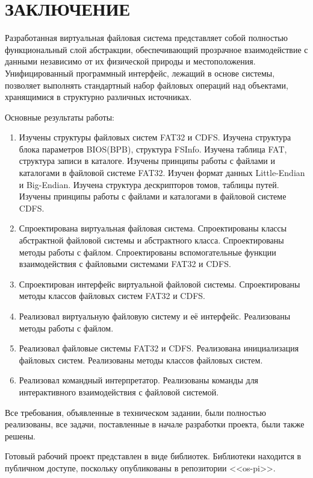 \section*{ЗАКЛЮЧЕНИЕ}

Разработанная виртуальная файловая система представляет собой полностью функциональный слой абстракции, обеспечивающий прозрачное взаимодействие с данными независимо от их физической природы и местоположения. Унифицированный программный интерфейс, лежащий в основе системы, позволяет выполнять стандартный набор файловых операций над объектами, хранящимися в структурно различных источниках.

Основные результаты работы:

\begin{enumerate}
\item Изучены структуры файловых систем FAT32 и CDFS. Изучена структура блока параметров BIOS(BPB), структура FSInfo. Изучена таблица FAT, структура записи в каталоге. Изучены принципы работы с файлами и каталогами в файловой системе FAT32. Изучен формат данных Little-Endian и Big-Endian. Изучена структура дескрипторов томов, таблицы путей. Изучены принципы работы с файлами и каталогами в файловой системе CDFS.
\item Спроектирована виртуальная файловая система. Спроектированы классы абстрактной файловой системы и абстрактного класса. Спроектированы методы работы с файлом. Спроектированы вспомогательные функции взаимодействия с файловыми системами FAT32 и CDFS.
\item Спроектирован интерфейс виртуальной файловой системы. Спроектированы методы классов файловых систем FAT32 и CDFS.
\item Реализовал виртуальную файловую систему и её интерфейс. Реализованы методы работы с файлом.
\item Реализовал файловые системы FAT32 и CDFS. Реализована инициализация файловых систем. Реализованы методы классов файловых систем.
\item Реализовал командный интерпретатор. Реализованы команды для интерактивного взаимодействия с файловой системой.
\end{enumerate}

Все требования, объявленные в техническом задании, были полностью реализованы, все задачи, поставленные в начале разработки проекта, были также решены.

Готовый рабочий проект представлен в виде библиотек. Библиотеки находится в публичном доступе, поскольку опубликованы в репозитории <<os-pi>>.  
